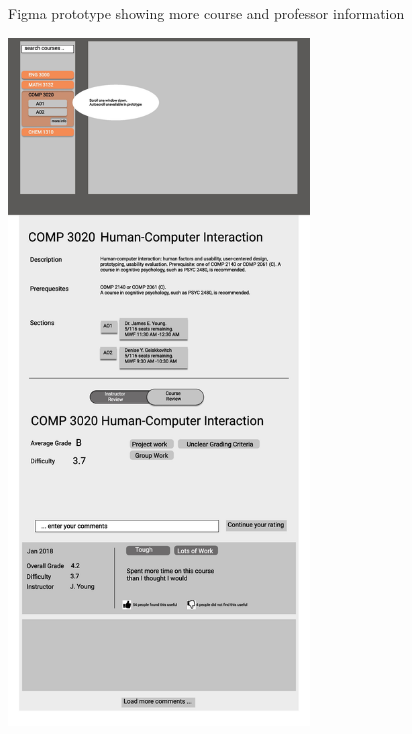 \documentclass{article}
\begin{document}
    \begin{figure}[h]
        \centering
        Figma prototype showing more course and professor information

        \includegraphics[width=8cm]{ViewCourseInfo_Prototype/Course_Instructor5.jpg}
        \hspace{2mm}

\end{figure}
\end{document}
